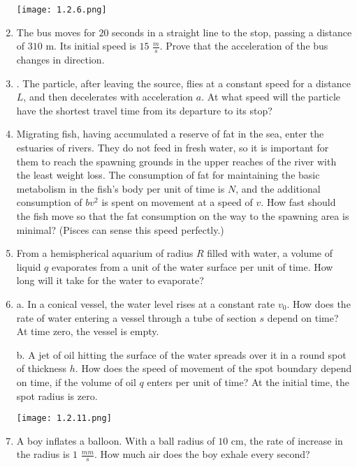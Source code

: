 \documentclass{article}
\begin{document}
\begin{enumerate}[label=1.2.\arabic*]
\begin{center}
    \texttt{[image: 1.2.6.png]}
\end{center}


\item The bus moves for $20$ seconds in a straight line to the stop, passing a distance of $310$ m. Its initial speed is $15$ $\frac{m}{s}$. Prove that the acceleration of the bus changes in direction.

\item . The particle, after leaving the source, flies at a constant speed for a distance $L$, and then decelerates with acceleration $a$. At what speed will the particle have the shortest travel time from its departure to its stop?

\item Migrating fish, having accumulated a reserve of fat in the sea, enter the estuaries of rivers. They do not feed in fresh water, so it is important for them to reach the spawning grounds in the upper reaches of the river with the least weight loss. The consumption of fat for maintaining the basic metabolism in the fish's body per unit of time is $N$, and the additional consumption of $bv^2$ is spent on movement at a speed of $v$. How fast should the fish move so that the fat consumption on the way to the spawning area is minimal? (Pisces can sense this speed perfectly.)

\item From a hemispherical aquarium of radius $R$ filled with water, a volume of liquid $q$ evaporates from a unit of the water surface per unit of time. How long will it take for the water to evaporate?

\item a. In a conical vessel, the water level rises at a constant rate $v_0$. How does the rate of water entering a vessel through a tube of section $s$ depend on time? At time zero, the vessel is empty.

b. A jet of oil hitting the surface of the water spreads over it in a round spot of thickness $h$. How does the speed of movement of the spot boundary depend on time, if the volume of oil $q$ enters per unit of time? At the initial time, the spot radius is zero.

\begin{center}
    \texttt{[image: 1.2.11.png]}
\end{center}

\item A boy inflates a balloon. With a ball radius of $10$ cm, the rate of increase in the radius is $1$ $\frac{mm}{s}$. How much air does the boy exhale every second?


\end{enumerate}
\end{document}
